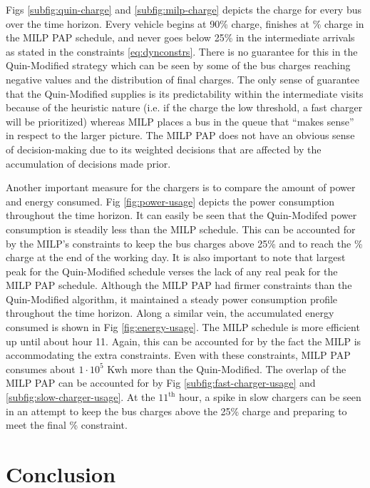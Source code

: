 \documentclass[utf8]{FrontiersinHarvard}
\newcommand{\bcharge}{0.7 }                                                     %
\newcommand{\mincharge}{25\% }                                                  %
\begin{document}
Figs \ref{subfig:quin-charge} and \ref{subfig:milp-charge} depicts the charge for every bus over the time horizon. Every
vehicle begins at 90\% charge, finishes at \fpeval{\bcharge *100}\% charge in the MILP PAP schedule, and never goes
below \mincharge in the intermediate arrivals as stated in the constraints \eqref{eq:dynconstrs}. There is no guarantee
for this in the Quin-Modified strategy which can be seen by some of the bus charges reaching negative values and the
distribution of final charges. The only sense of guarantee that the Quin-Modified supplies is its predictability within
the intermediate visits because of the heuristic nature (i.e. if the charge the low threshold, a fast charger will be
prioritized) whereas MILP places a bus in the queue that ``makes sense'' in respect to the larger picture. The MILP PAP
does not have an obvious sense of decision-making due to its weighted decisions that are affected by the accumulation of
decisions made prior.

Another important measure for the chargers is to compare the amount of power and energy consumed. Fig
\ref{fig:power-usage} depicts the power consumption throughout the time horizon. It can easily be seen that the
Quin-Modifed power consumption is steadily less than the MILP schedule. This can be accounted for by the MILP's
constraints to keep the bus charges above \mincharge and to reach the \fpeval{\bcharge *100}\% charge at the end of the
working day. It is also important to note that largest peak for the Quin-Modified schedule verses the lack of any real
peak for the MILP PAP schedule. Although the MILP PAP had firmer constraints than the Quin-Modified algorithm, it
maintained a steady power consumption profile throughout the time horizon. Along a similar vein, the accumulated energy
consumed is shown in Fig \ref{fig:energy-usage}. The MILP schedule is more efficient up until about hour 11. Again, this
can be accounted for by the fact the MILP is accommodating the extra constraints. Even with these constraints, MILP PAP
consumes about $1\cdot10^5$ Kwh more than the Quin-Modified. The overlap of the MILP PAP can be accounted for by Fig
\ref{subfig:fast-charger-usage} and \ref{subfig:slow-charger-usage}. At the $\text{11}^{\text{th}}$ hour, a spike in
slow chargers can be seen in an attempt to keep the bus charges above the \mincharge charge and preparing to meet the
final \fpeval{\bcharge * 100}\% constraint.

\section{Conclusion}
\label{sec:conclusion}
\end{document}
